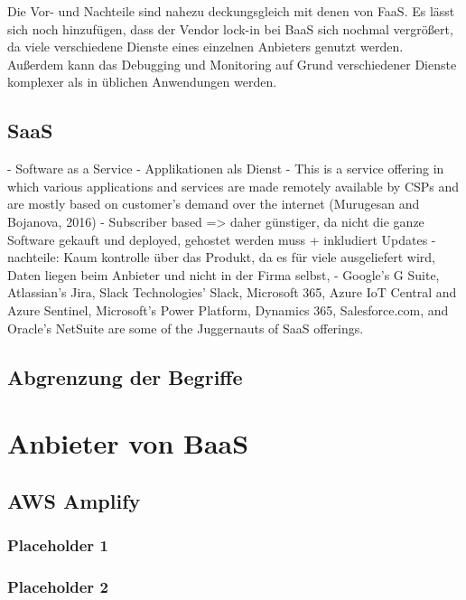 Die Vor- und Nachteile sind nahezu deckungsgleich mit denen von \ac{FaaS}. Es lässt sich noch hinzufügen, dass der Vendor lock-in bei \ac{BaaS} sich nochmal vergrößert, da viele verschiedene Dienste eines einzelnen Anbieters genutzt werden. Außerdem kann das Debugging und Monitoring auf Grund verschiedener Dienste komplexer als in üblichen Anwendungen werden.

\subsection{\acl{SaaS}}

- Software as a Service
    - Applikationen als Dienst
    - This is a service offering in which various applications and services are made remotely available by CSPs and are mostly based on customer’s demand over the internet (Murugesan and Bojanova, 2016)
    - Subscriber based => daher günstiger, da nicht die ganze Software gekauft und deployed, gehostet werden muss + inkludiert Updates
    - nachteile: Kaum kontrolle über das Produkt, da es für viele ausgeliefert wird, Daten liegen beim Anbieter und nicht in der Firma selbst,
    - Google’s G Suite, Atlassian’s Jira, Slack Technologies’ Slack, Microsoft 365, Azure IoT Central and Azure Sentinel, Microsoft’s Power Platform, Dynamics 365, Salesforce.com, and Oracle’s NetSuite are some of the Juggernauts of SaaS offerings.

\subsection{Abgrenzung der Begriffe}

\section{Anbieter von \acl{BaaS}}

\subsection{AWS Amplify}

\subsubsection{Placeholder 1}
\subsubsection{Placeholder 2}

\autocite{dahunsi2021commercial}
\autocite{amplifyDocs}
\autocite{lysakov2021security}
\autocite{mathew2014overview}
\autocite{beach2014aws}


